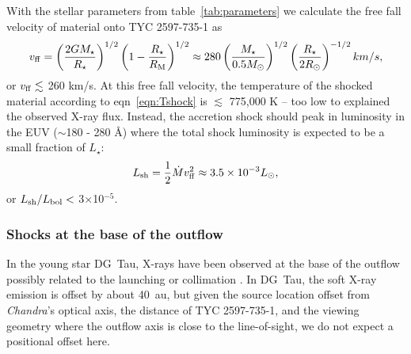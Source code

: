 \documentclass[]{aastex631}
\begin{document}
With the stellar parameters from table~\ref{tab:parameters} we calculate the free fall velocity of material onto TYC 2597-735-1 as
\begin{equation}
    v_{\rm ff} = \left( \frac{2 G M_{\star}}{R_{\star}} \right)^{1/2} \left( 1 - \frac{R_{\star}}{R_{\rm M}} \right)^{1/2} \approx 280 \left( \frac{M_{\star}}{0.5 M_{\odot}} \right)^{1/2} \left( \frac{R_{\star}}{2 R_{\odot}} \right)^{-1/2} km/s,
\end{equation}
or $v_{\rm ff} \lesssim$ 260 km/s. At this free fall velocity, the temperature of the shocked material according to eqn~\ref{eqn:Tshock} is $\lesssim$ 775,000 K -- too low to explained the observed X-ray flux.
Instead, the accretion shock should peak in luminosity in the EUV ($\sim$180 - 280 {\AA}) where the total shock luminosity is expected to be a small fraction of $L_{\star}$:
\begin{equation}
    L_{\rm sh} = \frac{1}{2} \dot{M} v_{\rm ff}^{2} \approx 3.5 \times 10^{-3} L_{\odot},
\end{equation}
or $L_{\rm sh}/L_{\rm bol} <$ 3$\times$10$^{-5}$.

\subsubsection{Shocks at the base of the outflow}
In the young star DG~Tau, X-rays have been observed at the base of the outflow \citep{2008A&A...488L..13S} possibly related to the launching or collimation \citep[e.g.]{2014ApJ...795...51G,2018A&A...615A.124U}. In DG~Tau, the soft X-ray emission is offset by about 40~au, but given the source location offset from \emph{Chandra}'s optical axis, the distance of TYC 2597-735-1, and the viewing geometry where the outflow axis is close to the line-of-sight, we do not expect a positional offset here.
\end{document}
